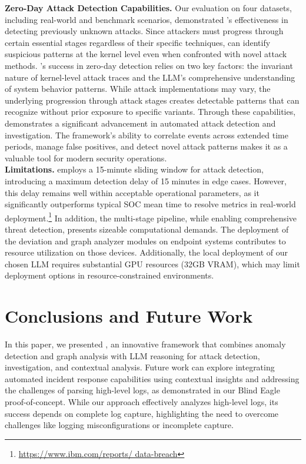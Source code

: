 \noindent\textbf{Zero-Day Attack Detection Capabilities.} Our evaluation on four datasets, including real-world and benchmark scenarios, demonstrated \method's effectiveness in detecting previously unknown attacks. 
Since attackers must progress through certain essential stages regardless of their specific techniques, \method can identify suspicious patterns at the kernel level even when confronted with novel attack methods.
\method's success in zero-day detection relies on two key factors: the invariant nature of kernel-level attack traces and the LLM's comprehensive understanding of system behavior patterns. 
While attack implementations may vary, the underlying progression through attack stages creates detectable patterns that \method can recognize without prior exposure to specific variants. 
Through these capabilities, \method demonstrates a significant advancement in automated attack detection and investigation.
The framework's ability to correlate events across extended time periods, manage false positives, and detect novel attack patterns makes it as a valuable tool for modern security operations. \\

\noindent\textbf{Limitations.}
\method employs a 15-minute sliding window for attack detection, introducing a maximum detection delay of 15 minutes in edge cases.
However, this delay remains well within acceptable operational parameters, as it significantly outperforms typical SOC mean time to resolve metrics in real-world deployment.\footnote{\url{https://www.ibm.com/reports/
data-breach}}
In addition, %
the multi-stage pipeline, while enabling comprehensive threat detection, presents sizeable computational demands. 
The deployment of the deviation and graph analyzer modules on endpoint systems contributes to resource utilization on those devices. 
Additionally, the local deployment of our chosen LLM requires substantial GPU resources (32GB VRAM), which may limit deployment options in resource-constrained environments.

\section{Conclusions and Future Work}

In this paper, we presented \method, an innovative framework that combines anomaly detection and graph analysis with LLM reasoning for attack detection, investigation, and contextual analysis.
Future work can explore integrating automated incident response capabilities using contextual insights and addressing the challenges of parsing high-level logs, as demonstrated in our Blind Eagle proof-of-concept. 
While our approach effectively analyzes high-level logs, its success depends on complete log capture, highlighting the need to overcome challenges like logging misconfigurations or incomplete capture.